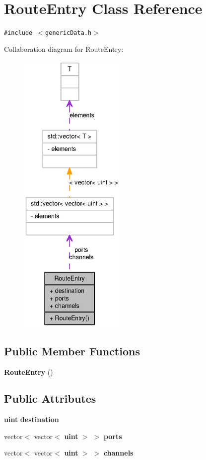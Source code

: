 \section{RouteEntry Class Reference}
\label{classRouteEntry}
{\tt \#include $<$genericData.h$>$}

Collaboration diagram for RouteEntry:\nopagebreak
\begin{figure}[H]
\begin{center}
\leavevmode
\includegraphics[height=400pt]{classRouteEntry__coll__graph}
\end{center}
\end{figure}
\subsection*{Public Member Functions}
\begin{CompactItemize}
\item 
{\bf RouteEntry} ()
\end{CompactItemize}
\subsection*{Public Attributes}
\begin{CompactItemize}
\item 
{\bf uint} {\bf destination}
\item 
vector$<$ vector$<$ {\bf uint} $>$ $>$ {\bf ports}
\item 
vector$<$ vector$<$ {\bf uint} $>$ $>$ {\bf channels}
\end{CompactItemize}


